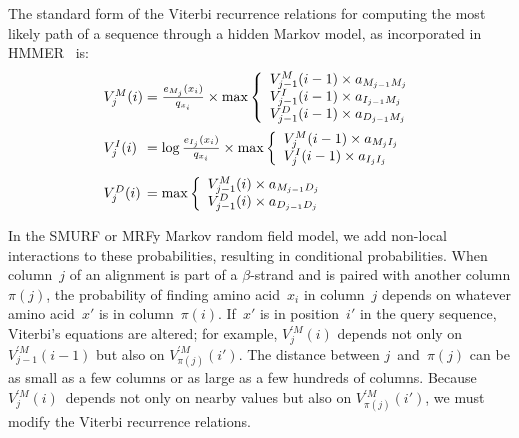 \documentclass{acm_proc_article-sp}
\begin{document}
The standard form of the Viterbi
recurrence relations for computing the most likely path of a sequence through
a hidden Markov model, as incorporated in HMMER~\cite{Eddy:1998ut} is:
\newcommand\txprobj[3][]{a#1_{{#2}_{j-1}{#3}_j}}
\newcommand\txprobjj[3][]{a#1_{{#2}_{j-1}{#3}_j}}
\newcommand\alignwidth{\ensuremath C} %
\newcommand\pairedwith[1]{{\pi(#1)}}
\newcommand\vsum[2]{#2&{}+{}& #1}
\def\goo{18pt}
\def\gum{14pt}
\def\maxiquad{\hskip 1.2em\relax}
\begin{equation*}
\begin{array}{@{}l@{}c@{}l}
V_{j}^{M}(i) &{}={}& \frac{e_{M_{j}}(x_{i})}{q_{x_{i}}} \times \max \left\{
  \begin{array}{l@{}c@{}l}
  V_{j-1}^{M}(i - 1) \times a_{M_{j-1}M_{j}}\\
  V_{j-1}^{I}(i - 1) \times a_{I_{j-1}M_{j}}\\
  V_{j-1}^{D}(i - 1) \times a_{D_{j-1}M_{j}}\\
  \end{array} \right.\\[\goo]
V_{j}^{I}(i) &=& \log\frac{e_{I_{j}}(x_{i})}{q_{x_{i}}} \times \max \left\{
  \begin{array}{l@{}c@{}l}
  V_{j}^{M}(i - 1) \times a_{M_{j}I_{j}}\\
  V_{j}^{I}(i - 1) \times a_{I_{j}I_{j}}\\
  \end{array} \right.\\[\gum]
V_{j}^{D}(i) &=& \max \left\{
  \begin{array}{l@{}c@{}l}
  V_{j-1}^{M}(i) \times a_{M_{j-1}D_{j}}\\
  V_{j-1}^{D}(i) \times a_{D_{j-1}D_{j}}\\
  \end{array} \right.\\
\end{array}
\end{equation*}

In the SMURF or MRFy Markov random field model, we add non-local interactions 
to these
probabilities, resulting in conditional probabilities.
When column~$j$ of an alignment is part of a $\beta$-strand and is paired
with another column  $\pairedwith j$,
the probability of finding amino acid~$x_i$ in column~$j$ 
depends on whatever amino acid~$x'$  is in column~${\pairedwith i}$.
If~$x'$ is in position~$i'$ in the query sequence, Viterbi's
equations are altered; for example,
$V_{j}^{\prime M}(i)$ depends not only on
$V_{j-1}^{\prime M}(i-1)$ but also on
$V_{\pairedwith j}^{\prime M}(i')$.
The distance between $j$~and~$\pairedwith j$ can be as small as a few
columns or as large as a few hundreds of columns.
Because $V_j^{\prime M}(i)$~depends not only on nearby values but also on
$V_{\pairedwith j}^{\prime M}(i')$,
we must modify the Viterbi recurrence relations.
\end{document}
